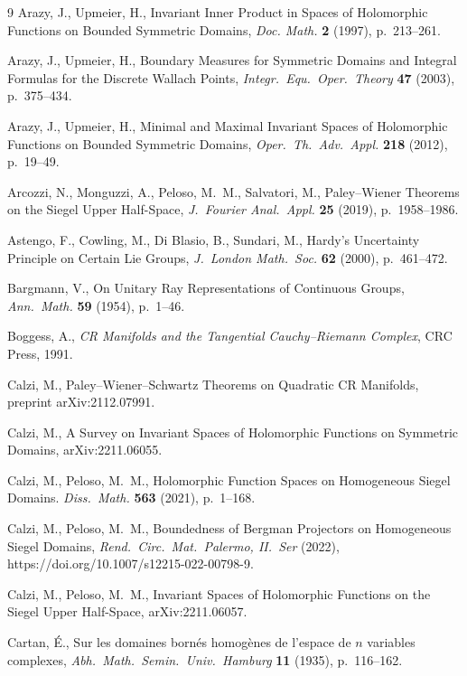\documentclass[10.5pt,reqno]{amsart}
\begin{document}
\begin{thebibliography}{9}
	Arazy, J., Upmeier, H., Invariant Inner Product in Spaces of Holomorphic Functions on Bounded Symmetric Domains, \emph{Doc. Math.} \textbf{2} (1997), p.~213--261.
	
	Arazy, J., Upmeier, H., Boundary Measures for Symmetric Domains and Integral Formulas for the Discrete Wallach Points, \emph{Integr.\ Equ.\ Oper.\ Theory} \textbf{47} (2003), p.~375--434.
	
	Arazy, J., Upmeier, H., Minimal and Maximal Invariant Spaces of Holomorphic Functions on Bounded Symmetric Domains, \emph{Oper.\ Th.\ Adv.\ Appl.} \textbf{218} (2012), p.~19--49.
	
	Arcozzi, N., Monguzzi, A., Peloso, M.\ M., Salvatori, M., Paley--Wiener Theorems on the Siegel Upper Half-Space, \emph{J.\ Fourier Anal.\ Appl.} \textbf{25} (2019), p.~1958--1986.
	
	Astengo, F.,  Cowling, M., Di Blasio, B., Sundari, M., Hardy’s Uncertainty Principle on Certain Lie Groups, \emph{J.\ London Math.\ Soc.} \textbf{62} (2000), p.~461--472.
	
	Bargmann, V., On Unitary Ray Representations of Continuous Groups, \emph{Ann.\ Math.} \textbf{59} (1954), p.~1--46.
	
	Boggess, A., \emph{CR Manifolds and the Tangential Cauchy--Riemann Complex}, CRC Press, 1991.
	

	
	Calzi, M., Paley--Wiener--Schwartz Theorems  on Quadratic CR Manifolds, preprint arXiv:2112.07991.
	
	
	Calzi, M., A Survey on Invariant Spaces of Holomorphic Functions on Symmetric Domains, arXiv:2211.06055.
	
	Calzi, M., Peloso, M.\ M., Holomorphic Function Spaces on Homogeneous Siegel Domains. \emph{Diss.\ Math.} \textbf{563} (2021), p.~1--168.
	
	Calzi, M., Peloso, M.\ M., Boundedness of Bergman	Projectors on Homogeneous Siegel Domains, \emph{Rend.\ Circ.\ Mat.\ Palermo, II.\ Ser} (2022), https://doi.org/10.1007/s12215-022-00798-9.
	
	Calzi, M., Peloso, M.\ M., Invariant Spaces of Holomorphic Functions on the Siegel Upper Half-Space,  	arXiv:2211.06057.

	Cartan, \'E., Sur les domaines bornés homogènes de l’espace de $n$ variables complexes, \emph{Abh.\	Math.\ Semin.\ Univ.\ Hamburg} \textbf{11} (1935), p.~116--162.
	

\end{thebibliography}
\end{document}
